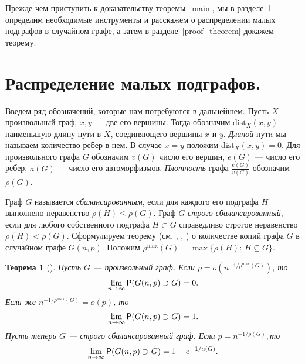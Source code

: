 \documentclass[12pt,a4paper,russian,titlepage]{article}
\newtheorem{Th}{Теорема}
\begin{document}

Прежде чем приступить к доказательству теоремы~\ref{main}, мы в разделе~\ref{EHR_game} определим необходимые инструменты и расскажем о распределении малых подграфов в случайном графе, а затем в разделе~\ref{proof_theorem} докажем теорему.


\section{Распределение малых подграфов.}\label{EHR_game}

Введем ряд обозначений, которые нам потребуются в дальнейшем. Пусть $X$ --- произвольный граф, $x,y$ --- две его вершины. Тогда обозначим $\mathrm{dist}_X(x,y)$ наименьшую длину пути в $X$, соединяющего вершины $x$ и
$y$. {\it Длиной} пути мы называем количество ребер в нем. В случае $x=y$ положим $\mathrm{dist}_X(x,y)=0$.
Для произвольного графа $G$ обозначим $v(G)$ число его вершин, $e(G)$ --- число его ребер, $a(G)$ --- число его автоморфизмов. {\it Плотность} графа $\frac{e(G)}{v(G)}$ обозначим $\rho(G)$.


Граф $G$ называется \emph{сбалансированным}, если для каждого его
подграфа $H$ выполнено неравенство $\rho(H)\leq \rho(G).$ Граф $G$
\emph{строго сбалансированный}, если для любого собственного подграфа  $H\subset G$
справедливо строгое неравенство $\rho(H)<\rho(G).$
Сформулируем теорему (см. \cite{Janson},  \cite{Uspekhi}, \cite{BolThreshold}) о
количестве копий графа $G$ в случайном графе $G(n,p).$ %
Положим
$\rho^{\max}(G)=\max\{\rho(H):\,H\subseteq G\}.$\\

\begin{Th} [\cite{BolThreshold}] \label{first}
Пусть $G$ --- произвольный граф. Если $p=o\left(n^{-1/\rho^{\max}(G)}\right)$, то
$$
 \lim_{n\rightarrow\infty}{\sf P}(G(n,p)\supset G)=0.
$$
Если же $n^{-1/\rho^{\max}(G)}=o(p)$, то
$$
 \lim_{n\rightarrow\infty}{\sf P}(G(n,p)\supset G)=1.
$$
Пусть теперь $G$ --- строго сбалансированный граф. Если
$p = n^{-1/\rho(G)}, $то
$$
 \lim_{n\rightarrow\infty}{\sf P}(G(n,p)\supset G)=1-e^{-1/a(G)}.
$$

\label{erdos}
\end{Th}
\end{document}
